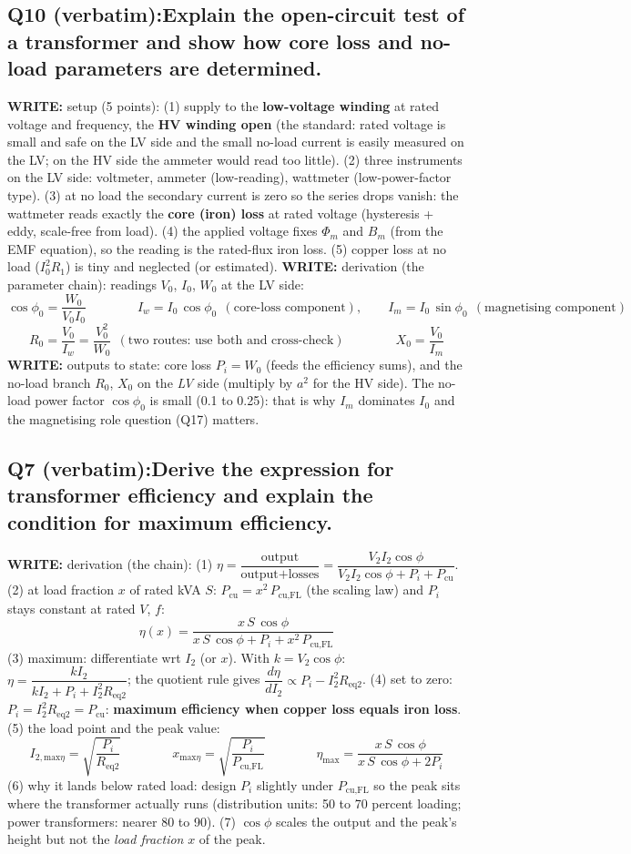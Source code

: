 \documentclass[11pt]{article}
\newcommand{\q}[2]{\subsection*{\color{copper}#1\quad\color{iron}#2}}
\newcommand{\w}[1]{\textbf{\color{copper}WRITE:} #1}
\begin{document}
\q{Q10 (verbatim):}{Explain the open-circuit test of a transformer and show how core loss and no-load parameters are determined.}
\w{setup (5 points):} (1) supply to the \textbf{low-voltage winding} at rated voltage and frequency, the \textbf{HV winding open} (the standard: rated voltage is small and safe on the LV side and the small no-load current is easily measured on the LV; on the HV side the ammeter would read too little). (2) three instruments on the LV side: voltmeter, ammeter (low-reading), wattmeter (low-power-factor type). (3) at no load the secondary current is zero so the series drops vanish: the wattmeter reads exactly the \textbf{core (iron) loss} at rated voltage (hysteresis + eddy, scale-free from load). (4) the applied voltage fixes $\Phi_m$ and $B_m$ (from the EMF equation), so the reading is the rated-flux iron loss. (5) copper loss at no load ($I_0^{2} R_1$) is tiny and neglected (or estimated).
\w{derivation (the parameter chain):} readings $V_0$, $I_0$, $W_0$ at the LV side:
\[
\cos\phi_0 = \dfrac{W_0}{V_0 I_0}
\qquad\qquad
I_w = I_0\, \cos\phi_0\ \ (\text{core-loss component}), \qquad
I_m = I_0\, \sin\phi_0\ \ (\text{magnetising component})
\]
\[
R_0 = \dfrac{V_0}{I_w} = \dfrac{V_0^{2}}{W_0}\ \ (\text{two routes: use both and cross-check})
\qquad\qquad
X_0 = \dfrac{V_0}{I_m}
\]
\w{outputs to state:} core loss $P_i = W_0$ (feeds the efficiency sums), and the no-load branch $R_0$, $X_0$ on the \emph{LV} side (multiply by $a^{2}$ for the HV side). The no-load power factor $\cos\phi_0$ is small (0.1 to 0.25): that is why $I_m$ dominates $I_0$ and the magnetising role question (Q17) matters.

\q{Q7 (verbatim):}{Derive the expression for transformer efficiency and explain the condition for maximum efficiency.}
\w{derivation (the chain):} (1) $\eta = \dfrac{\text{output}}{\text{output} + \text{losses}} = \dfrac{V_2 I_2 \cos\phi}{V_2 I_2 \cos\phi + P_i + P_{\text{cu}}}$. (2) at load fraction $x$ of rated kVA $S$: $P_{\text{cu}} = x^{2}\, P_{\text{cu,FL}}$ (the scaling law) and $P_i$ stays constant at rated $V$, $f$:
\[
\boxed{\eta(x) = \dfrac{x\, S\, \cos\phi}{x\, S\, \cos\phi + P_i + x^{2}\, P_{\text{cu,FL}}}}
\]
(3) maximum: differentiate wrt $I_2$ (or $x$). With $k = V_2 \cos\phi$: $\eta = \dfrac{k I_2}{k I_2 + P_i + I_2^{2} R_{\text{eq2}}}$; the quotient rule gives $\dfrac{d\eta}{dI_2} \propto P_i - I_2^{2} R_{\text{eq2}}$. (4) set to zero: $\boxed{P_i = I_2^{2} R_{\text{eq2}} = P_{\text{cu}}}$: \textbf{maximum efficiency when copper loss equals iron loss}. (5) the load point and the peak value:
\[
I_{2,\text{max}\eta} = \sqrt{\dfrac{P_i}{R_{\text{eq2}}}}
\qquad\qquad
x_{\text{max}\eta} = \sqrt{\dfrac{P_i}{P_{\text{cu,FL}}}}
\qquad\qquad
\eta_{\text{max}} = \dfrac{x\, S\, \cos\phi}{x\, S\, \cos\phi + 2 P_i}
\]
(6) why it lands below rated load: design $P_i$ slightly under $P_{\text{cu,FL}}$ so the peak sits where the transformer actually runs (distribution units: 50 to 70 percent loading; power transformers: nearer 80 to 90). (7) $\cos\phi$ scales the output and the peak's height but not the \emph{load fraction} $x$ of the peak.
\end{document}
